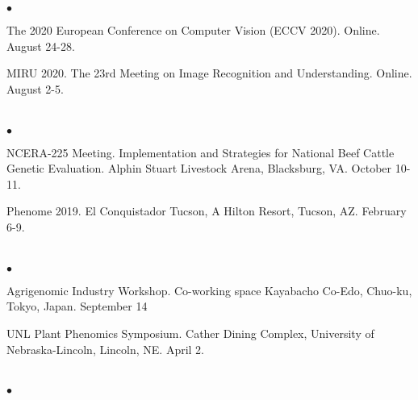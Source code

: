 \documentclass[margin,line,10pt]{res}
\newenvironment{list2}{
  \begin{list}{$\bullet$}{%
      \setlength{\itemsep}{0in}
      \setlength{\parsep}{0in} \setlength{\parskip}{0in}
      \setlength{\topsep}{0in} \setlength{\partopsep}{0in} 
      \setlength{\leftmargin}{0.2in}}}{\end{list}}
\begin{document}
\begin{resume}
\begin{list2}
    \vspace{0.5cm}
    
\item The 2020 European Conference on Computer Vision (ECCV 2020). Online. August 24-28.  

      \vspace{0.5cm}

\item MIRU 2020. The 23rd Meeting on Image Recognition and Understanding. Online. August 2-5. 

\end{list2}



\section{}
\begin{list2}

\item NCERA-225 Meeting. Implementation and Strategies for National Beef Cattle Genetic Evaluation. Alphin Stuart Livestock Arena, Blacksburg, VA. October 10-11.

  \vspace{0.5cm}

\item Phenome 2019. El Conquistador Tucson, A Hilton Resort, Tucson, AZ. February 6-9.

\end{list2}




\section{}
\begin{list2}

  \item Agrigenomic Industry Workshop. Co-working space Kayabacho Co-Edo, Chuo-ku, Tokyo, Japan. September 14

    \vspace{0.5cm}
    
\item UNL Plant Phenomics Symposium. Cather Dining Complex, University of Nebraska-Lincoln, Lincoln, NE. April 2.

\end{list2}


\section{}
\begin{list2}


\end{list2}
\end{resume}
\end{document}
